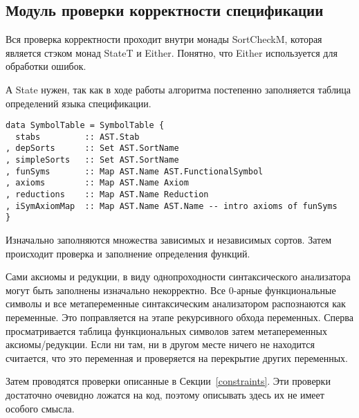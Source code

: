 \subsection{Модуль проверки корректности спецификации}\label{sortcheck}
Вся проверка корректности проходит внутри монады SortCheckM, которая является стэком монад StateT и Either. Понятно, что Either используется для обработки ошибок.

А State нужен, так как в ходе работы алгоритма постепенно заполняется таблица определений языка спецификации.


\begin{lstlisting}[caption={Структура заполняемая модулем проверки спецификации},captionpos=b,frame=single, label={SymTab}]
data SymbolTable = SymbolTable {
  stabs         :: AST.Stab
, depSorts      :: Set AST.SortName
, simpleSorts   :: Set AST.SortName
, funSyms       :: Map AST.Name AST.FunctionalSymbol
, axioms        :: Map AST.Name Axiom
, reductions    :: Map AST.Name Reduction
, iSymAxiomMap  :: Map AST.Name AST.Name -- intro axioms of funSyms
}
\end{lstlisting}


Изначально заполняются множества зависимых и независимых сортов. Затем происходит проверка и заполнение определения функций.

Сами аксиомы и редукции, в виду однопроходности синтаксического анализатора могут быть заполнены изначально некорректно. Все 0-арные функциональные символы и все метапеременные синтаксическим анализатором распознаются как переменные. Это поправляется на этапе рекурсивного обхода переменных. Сперва просматривается таблица функциональных символов затем метапеременных аксиомы/редукции. Если ни там, ни в другом месте ничего не находится считается, что это переменная и проверяется на перекрытие других переменных.

Затем проводятся проверки описанные в Секции~\ref{constraints}. Эти проверки достаточно очевидно ложатся на код, поэтому описывать здесь их не имеет особого смысла.




















